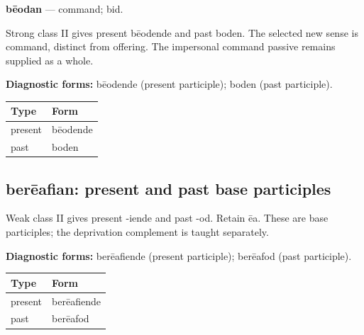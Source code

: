 \par\begin{minipage}{\linewidth}\raggedright
\textbf{bēodan} — command; bid.

Strong class II gives present bēodende and past boden. The selected new sense is command, distinct from offering. The impersonal command passive remains supplied as a whole.

\textbf{Diagnostic forms:} bēodende (present participle); boden (past participle).

\par\begingroup
\fontsize{10.5}{13.2}\selectfont
\setlength{\LTleft}{0pt}\setlength{\LTright}{\fill}
\noindent
\begin{tabular}{@{}>{\raggedright\arraybackslash}p{60.59mm}>{\raggedright\arraybackslash}p{60.59mm}@{}}
\toprule
\textbf{Type} & \textbf{Form} \\
\midrule
present & bēodende \\
past & boden \\
\bottomrule
\end{tabular}
\par\endgroup

\end{minipage}\par
{}
\subsection*{berēafian: present and past base participles}

Weak class II gives present -iende and past -od. Retain ēa. These are base participles; the deprivation complement is taught separately.

\textbf{Diagnostic forms:} berēafiende (present participle); berēafod (past participle).

\par\begingroup
\fontsize{10.5}{13.2}\selectfont
\setlength{\LTleft}{0pt}\setlength{\LTright}{\fill}
\noindent
\begin{tabular}{@{}>{\raggedright\arraybackslash}p{57.71mm}>{\raggedright\arraybackslash}p{63.48mm}@{}}
\toprule
\textbf{Type} & \textbf{Form} \\
\midrule
present & berēafiende \\
past & berēafod \\
\bottomrule
\end{tabular}
\par\endgroup

